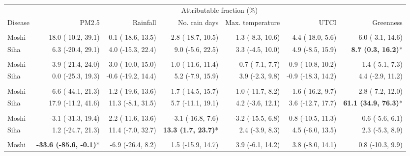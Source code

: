 \begin{table}[t]
\fontsize{12.0pt}{14.4pt}\selectfont
\begin{tabular*}{\linewidth}{@{\extracolsep{\fill}}l|rrrrrr}
\toprule
 & \multicolumn{6}{c}{Attributable fraction (\%)} \\ 
\cmidrule(lr){2-7}
Disease & PM2.5 & Rainfall & No. rain days & Max. temperature & UTCI & Greenness \\ 
\midrule\addlinespace[2.5pt]
\multicolumn{7}{l}{Chronic Respiratory Disease} \\[2.5pt] 
\midrule\addlinespace[2.5pt]
Moshi & 18.0 (-10.2, 39.1) & 0.1 (-18.6, 13.5) & -2.8 (-18.7, 10.5) & 1.3 (-8.3, 10.6) & -4.4 (-18.0, 5.6) & 6.0 (-3.1, 14.6) \\ 
Siha & 6.3 (-20.4, 29.1) & 4.0 (-15.3, 22.4) & 9.0 (-5.6, 22.5) & 3.3 (-4.5, 10.0) & 4.9 (-8.5, 15.9) & \textbf{8.7 (0.3, 16.2)}* \\ 
\midrule\addlinespace[2.5pt]
\multicolumn{7}{l}{Hypertension} \\[2.5pt] 
\midrule\addlinespace[2.5pt]
Moshi & 3.9 (-21.4, 24.0) & 3.0 (-10.0, 15.0) & 1.0 (-11.6, 11.4) & 0.7 (-7.1, 7.7) & 0.9 (-10.8, 10.2) & 1.4 (-5.1, 7.3) \\ 
Siha & 0.0 (-25.3, 19.3) & -0.6 (-19.2, 14.4) & 5.2 (-7.9, 15.9) & 3.9 (-2.3, 9.8) & -0.9 (-18.3, 14.2) & 4.4 (-2.9, 11.2) \\ 
\midrule\addlinespace[2.5pt]
\multicolumn{7}{l}{Diabetes Mellitus} \\[2.5pt] 
\midrule\addlinespace[2.5pt]
Moshi & -6.6 (-44.1, 21.3) & -1.2 (-19.6, 13.6) & 1.7 (-14.5, 15.7) & -1.0 (-11.7, 8.2) & -1.6 (-16.2, 9.7) & 2.8 (-7.2, 12.0) \\ 
Siha & 17.9 (-11.2, 41.6) & 11.3 (-8.1, 31.5) & 5.7 (-11.1, 19.1) & 4.2 (-3.6, 12.1) & 3.6 (-12.7, 17.7) & \textbf{61.1 (34.9, 76.3)}* \\ 
\midrule\addlinespace[2.5pt]
\multicolumn{7}{l}{Upper Respiratory Infections} \\[2.5pt] 
\midrule\addlinespace[2.5pt]
Moshi & -3.1 (-31.3, 19.4) & 2.2 (-11.6, 13.6) & -3.1 (-16.8, 7.6) & -3.2 (-15.5, 6.8) & 0.8 (-10.5, 11.3) & 0.6 (-5.6, 6.1) \\ 
Siha & 1.2 (-24.7, 21.3) & 11.4 (-7.0, 32.7) & \textbf{13.3 (1.7, 23.7)}* & 2.4 (-3.9, 8.3) & 4.5 (-6.0, 13.5) & 2.3 (-5.3, 8.9) \\ 
\midrule\addlinespace[2.5pt]
\multicolumn{7}{l}{Diarrhea} \\[2.5pt] 
\midrule\addlinespace[2.5pt]
Moshi & \textbf{-33.6 (-85.6, -0.1)}* & -6.9 (-26.4, 8.2) & 1.5 (-15.9, 14.7) & 3.9 (-6.1, 14.2) & 3.8 (-8.0, 14.1) & 0.8 (-10.3, 9.9) \\ 

\end{tabular*}
\end{table}
